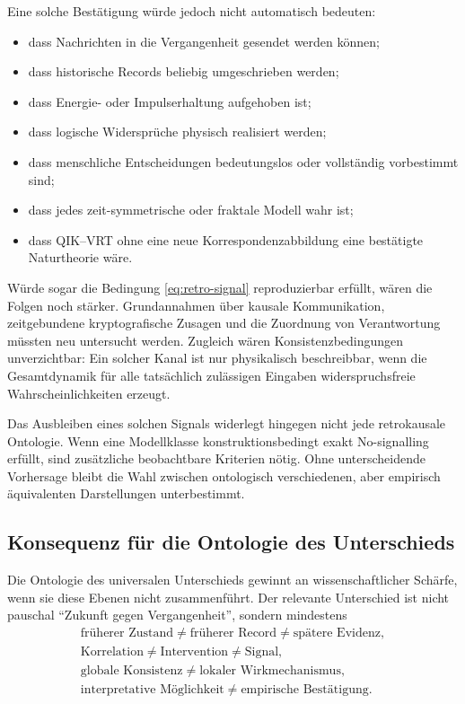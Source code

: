 \documentclass[11pt,a4paper]{article}
\theoremstyle{remark}
\begin{document}
Eine solche Bestätigung würde jedoch nicht automatisch bedeuten:
\begin{itemize}
  \item dass Nachrichten in die Vergangenheit gesendet werden können;
  \item dass historische Records beliebig umgeschrieben werden;
  \item dass Energie- oder Impulserhaltung aufgehoben ist;
  \item dass logische Widersprüche physisch realisiert werden;
  \item dass menschliche Entscheidungen bedeutungslos oder vollständig
  vorbestimmt sind;
  \item dass jedes zeit-symmetrische oder fraktale Modell wahr ist;
  \item dass QIK--VRT ohne eine neue Korrespondenzabbildung eine bestätigte
  Naturtheorie wäre.
\end{itemize}

Würde sogar die Bedingung \eqref{eq:retro-signal} reproduzierbar erfüllt, wären die Folgen
noch stärker. Grundannahmen über kausale Kommunikation, zeitgebundene
kryptografische Zusagen und die Zuordnung von Verantwortung müssten neu
untersucht werden. Zugleich wären Konsistenzbedingungen unverzichtbar: Ein
solcher Kanal ist nur physikalisch beschreibbar, wenn die Gesamtdynamik für
alle tatsächlich zulässigen Eingaben widerspruchsfreie Wahrscheinlichkeiten
erzeugt.

Das Ausbleiben eines solchen Signals widerlegt hingegen nicht jede
retrokausale Ontologie. Wenn eine Modellklasse konstruktionsbedingt exakt
No-signalling erfüllt, sind zusätzliche beobachtbare Kriterien nötig. Ohne
unterscheidende Vorhersage bleibt die Wahl zwischen ontologisch verschiedenen,
aber empirisch äquivalenten Darstellungen unterbestimmt.

\subsection{Konsequenz für die Ontologie des Unterschieds}

Die Ontologie des universalen Unterschieds gewinnt an wissenschaftlicher
Schärfe, wenn sie diese Ebenen nicht zusammenführt. Der relevante Unterschied
ist nicht pauschal ``Zukunft gegen Vergangenheit'', sondern mindestens
\[
\begin{gathered}
  \text{früherer Zustand}
  \neq\text{früherer Record}
  \neq\text{spätere Evidenz},\\
  \text{Korrelation}
  \neq\text{Intervention}
  \neq\text{Signal},\\
  \text{globale Konsistenz}
  \neq\text{lokaler Wirkmechanismus},\\
  \text{interpretative Möglichkeit}
  \neq\text{empirische Bestätigung}.
\end{gathered}
\]
\end{document}
